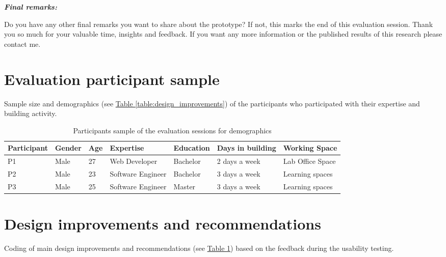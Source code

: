 \begin{appendices}
\textit{\textbf{Final remarks:}}

Do you have any other final remarks you want to share about the prototype?  If not, this marks the end of this evaluation session. Thank you so much for your valuable time, insights and feedback. If you want any more information or the published results of this research please contact me.\\

\newpage

\section{Evaluation participant sample}
\label{appendix:participants}

Sample size and demographics (see \hyperref[table:design_improvements]{Table \ref{table:design_improvements}}) of the participants who participated with their expertise and building activity.

\begin{table}[h!]
\centering
\begin{tabular}{| p{2cm} | p{1.5cm} | p{1cm} | p{3cm} | p{2cm} | p{3cm} | p{3cm} |}
\hline
\textbf{Participant} & \textbf{Gender} & \textbf{Age} & \textbf{Expertise} & \textbf{Education} & \textbf{Days in building} & \textbf{Working Space} \\ 
\hline
P1 & Male & 27 & Web Developer & Bachelor & 2 days a week & Lab Office Space \\ 
\hline
P2 & Male & 23 & Software Engineer & Bachelor & 3 days a week &  Learning spaces \\ 
\hline
P3 & Male & 25 & Software Engineer & Master & 3 days a week & Learning spaces \\ 
\hline
\end{tabular}
\caption{Participants sample of the evaluation sessions for demographics}
\label{table:participants}
\end{table}


\section{Design improvements and recommendations}
\label{appendix:improvements}

Coding of main design improvements and recommendations (see \hyperref[table:participants]{Table \ref{table:participants}}) based on the feedback during the usability testing.



\end{appendices}
